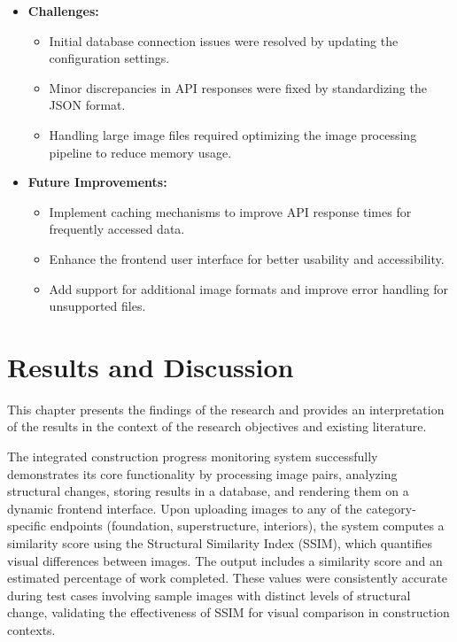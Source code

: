 \documentclass[12pt,a4paper]{report}
\begin{document}
\begin{itemize}
\begin{itemize}
    \end{itemize}
    \item \textbf{Challenges:}
    \begin{itemize}
        \item Initial database connection issues were resolved by updating the configuration settings.
        \item Minor discrepancies in API responses were fixed by standardizing the JSON format.
        \item Handling large image files required optimizing the image processing pipeline to reduce memory usage.
    \end{itemize}
    \item \textbf{Future Improvements:}
    \begin{itemize}
        \item Implement caching mechanisms to improve API response times for frequently accessed data.
        \item Enhance the frontend user interface for better usability and accessibility.
        \item Add support for additional image formats and improve error handling for unsupported files.
    \end{itemize}
\end{itemize}

\chapter{Results and Discussion}
This chapter presents the findings of the research and provides an interpretation of the results in the context of the research objectives and existing literature.

The integrated construction progress monitoring system successfully demonstrates its core functionality by processing image pairs, analyzing structural changes, storing results in a database, and rendering them on a dynamic frontend interface. Upon uploading images to any of the category-specific endpoints (foundation, superstructure, interiors), the system computes a similarity score using the Structural Similarity Index (SSIM), which quantifies visual differences between images. The output includes a similarity score and an estimated percentage of work completed. These values were consistently accurate during test cases involving sample images with distinct levels of structural change, validating the effectiveness of SSIM for visual comparison in construction contexts.
\end{document}
